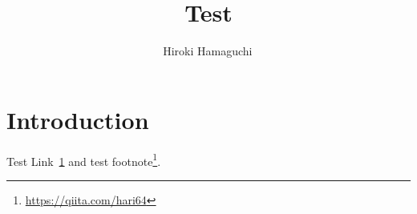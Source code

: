 \documentclass[11pt, dvipdfmx]{article}
\begin{document}
\title{Test}

\author[1]{Hiroki Hamaguchi\,}
\date{}

\maketitle

\section{Introduction}\label{sec:introduction}

Test Link~\ref{sec:introduction} and test footnote\footnote{\url{https://qiita.com/hari64}}.
\end{document}

